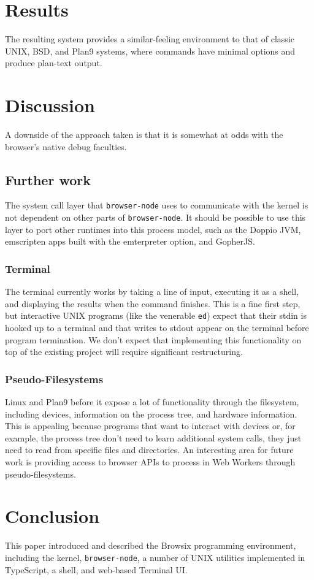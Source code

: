 \documentclass{acm_proc_article-sp}
\begin{document}
\section{Results}

The resulting system provides a similar-feeling environment to that of
classic UNIX, BSD, and Plan9 systems, where commands have minimal
options and produce plan-text output.

\section{Discussion}

A downside of the approach taken is that it is somewhat at odds with
the browser's native debug faculties.

\subsection{Further work}

The system call layer that \texttt{browser-node} uses to communicate
with the kernel is not dependent on other parts of
\texttt{browser-node}.  It should be possible to use this layer to
port other runtimes into this process model, such as the Doppio JVM,
emscripten apps built with the emterpreter option, and GopherJS.

\subsubsection{Terminal}

The terminal currently works by taking a line of input, executing it
as a shell, and displaying the results when the command finishes.
This is a fine first step, but interactive UNIX programs (like the
venerable \texttt{ed}) expect that their stdin is hooked up to a
terminal and that writes to stdout appear on the terminal before
program termination.  We don't expect that implementing this
functionality on top of the existing project will require significant
restructuring.

\subsubsection{Pseudo-Filesystems}

Linux and Plan9 before it expose a lot of functionality through the
filesystem, including devices, information on the process tree, and
hardware information.  This is appealing because programs that want to
interact with devices or, for example, the process tree don't need to
learn additional system calls, they just need to read from specific
files and directories.  An interesting area for future work is
providing access to browser APIs to process in Web Workers through
pseudo-filesystems.

\section{Conclusion}

This paper introduced and described the Browsix programming
environment, including the kernel, \texttt{browser-node}, a number of
UNIX utilities implemented in TypeScript, a shell, and web-based
Terminal UI.




\balancecolumns
\end{document}
